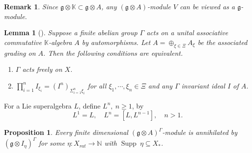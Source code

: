 \documentclass[11pt]{amsart}
\theoremstyle{plain}
\newtheorem{prop}[thm]{Proposition}
\newtheorem{lemma}[thm]{Lemma}
\newtheorem{rem}[thm]{Remark}
\theoremstyle{definition}
\newcommand{\g}{\mathfrak{g}}
\DeclareMathOperator{\Supp}{Supp}
\begin{document}
\begin{rem}
    Since $\g\otimes\mathbb{K}\subset\g\otimes A$, any $(\g\otimes A)$-module $V$ can be viewed as a $\g$-module. 
\end{rem}
\begin{lemma}[\cite{NS}]\label{lem:12}
Suppose a finite abelian group $\Gamma$ acts on a unital associative commutative $\mathbb{K}$-algebra $A$ by automorphisms. Let $A=\oplus_{\xi\in\Xi}A_{\xi}$ be the associated grading on $A$. Then the following conditions are equivalent.
    \begin{enumerate}[label=(\alph*)]
        \item $\Gamma$ acts freely on $X$.
        \item  $\prod_{i=1}^{n}I_{\xi_{i}}=(I^{n})_{\Sigma_{i=1}^{n}\xi_{i}}$ for all $\xi_{1},\cdots,\xi_{n}\in\Xi$ and any $\Gamma$ invariant ideal $I$ of $A$.
    \end{enumerate}
\end{lemma}
For a Lie superalgebra $L$, define $L^{n},~n\geq 1$, by
\begin{equation*}
    L^{1}=L, \quad L^{n}=[L,L^{n-1}],\quad n>1.
\end{equation*}
\begin{prop}\label{prop:3}
Every finite dimensional $(\g\otimes A)^{\Gamma}$-module is annihilated by $(\g\otimes I_{\eta})^{\Gamma}$ for some $\eta:X_{rat}\rightarrow\mathbb{N}$ with $\Supp~\eta\subseteq X_{*}$.
\end{prop}
\end{document}
